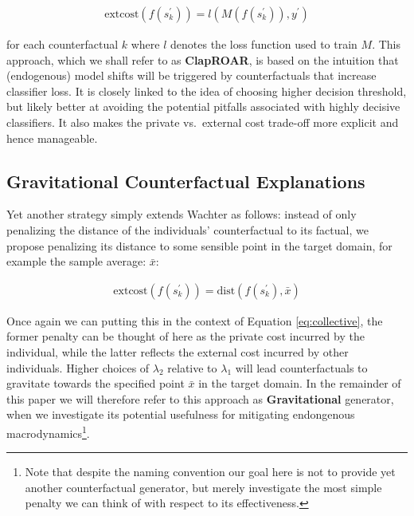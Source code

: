 \documentclass[conference,final,]{IEEEtran}
\begin{document}
\begin{equation}
\begin{aligned}
\text{extcost}(f(s_k^\prime)) = l(M(f(s_k^\prime)),y^\prime) \label{eq:clap}
\end{aligned}
\end{equation}

for each counterfactual \(k\) where \(l\) denotes the loss function used to train \(M\). This approach, which we shall refer to as \textbf{ClapROAR}, is based on the intuition that (endogenous) model shifts will be triggered by counterfactuals that increase classifier loss. It is closely linked to the idea of choosing higher decision threshold, but likely better at avoiding the potential pitfalls associated with highly decisive classifiers. It also makes the private vs.~external cost trade-off more explicit and hence manageable.

\hypertarget{gravitational-counterfactual-explanations}{%
\subsection{Gravitational Counterfactual Explanations}\label{gravitational-counterfactual-explanations}}

Yet another strategy simply extends Wachter as follows: instead of only penalizing the distance of the individuals' counterfactual to its factual, we propose penalizing its distance to some sensible point in the target domain, for example the sample average: \(\bar{x}\):

\begin{equation}
\begin{aligned}
\text{extcost}(f(s_k^\prime)) = \text{dist}(f(s_k^\prime),\bar{x})  \label{eq:grav}
\end{aligned}
\end{equation}

Once again we can putting this in the context of Equation \eqref{eq:collective}, the former penalty can be thought of here as the private cost incurred by the individual, while the latter reflects the external cost incurred by other individuals. Higher choices of \(\lambda_2\) relative to \(\lambda_1\) will lead counterfactuals to gravitate towards the specified point \(\bar{x}\) in the target domain. In the remainder of this paper we will therefore refer to this approach as \textbf{Gravitational} generator, when we investigate its potential usefulness for mitigating endongenous macrodynamics\footnote{Note that despite the naming convention our goal here is not to provide yet another counterfactual generator, but merely investigate the most simple penalty we can think of with respect to its effectiveness.}.
\end{document}
